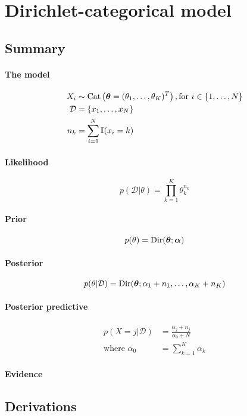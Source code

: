 \section{Dirichlet-categorical model}
\subsection{Summary}
\paragraph{The model}
    \begin{align}
        X_i         &\sim \operatorname{Cat}\left(\boldsymbol{\mathbf{\theta}} = (\theta_1, \dotsc, \theta_K)^T\right), \text{for } i \in \{1, \dotsc, N\} \\
        \mathcal D  &= \{x_1, \dotsc, x_N\} \\
        n_k         &= \sum_{i = 1}^N \mathbb I (x_i = k)
    \end{align}

\paragraph{Likelihood}
    \begin{equation}
        p(\mathcal D | \theta) = \prod_{k = 1}^K \theta_k^{n_k}
    \end{equation}

\paragraph{Prior}
    \begin{equation}
        p(\theta)   = \operatorname{Dir}(\boldsymbol{\mathbf{\theta}}; \boldsymbol{\mathbf{\alpha}})
    \end{equation}

\paragraph{Posterior}
    \begin{equation}
        p(\theta | \mathcal D) = \operatorname{Dir}(\boldsymbol{\mathbf{\theta}}; \alpha_1 + n_1, \dotsc, \alpha_K + n_K)
    \end{equation}

\paragraph{Posterior predictive}
    \begin{align}
        p(X = j | \mathcal D) &= \frac{\alpha_j + n_j}{\alpha_0 + N} \\
        \text{where } \alpha_0 &= \sum_{k = 1}^K \alpha_k
    \end{align}

\paragraph{Evidence}

\subsection{Derivations}
